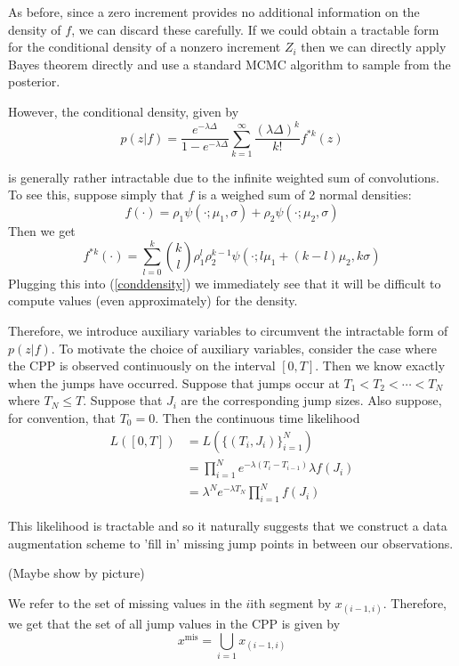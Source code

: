 \documentclass[a4paper,11pt]{article}
\theoremstyle{theorem}
\theoremstyle{definition}
\theoremstyle{remark}
\begin{document}
As before, since a zero increment provides no additional information on the density of $f$, we can discard these carefully. If we could obtain a tractable form for the conditional density of a nonzero increment $Z_i$ then we can directly apply Bayes theorem directly and use a standard MCMC algorithm to sample from the posterior.

However, the conditional density, given by
\begin{equation} \label{conddensity}
p(z | f) = \frac{e^{-\lambda \Delta}}{1- e^{-\lambda \Delta}}\sum_{k=1}^{\infty}{\frac{(\lambda \Delta)^k}{k!}f^{\ast k}(z)}
\end{equation}


is generally rather intractable due to the infinite weighted sum of convolutions. To see this, suppose simply that $f$ is a weighed sum of 2 normal densities:
\[
f(\cdot) = \rho_1 \psi(\cdot; \mu_1, \sigma) + \rho_2 \psi(\cdot; \mu_2, \sigma)
\]
Then we get
\[
f^{\ast k}(\cdot) = \sum_{l=0}^{k}{\binom{k}{l} \rho_{1}^{l}\rho_{2}^{k-1}\psi(\cdot; l\mu_1 + (k-l)\mu_2, k\sigma)}
\]
Plugging this into (\ref{conddensity}) we immediately see that it will be difficult to compute values (even approximately) for the density.

Therefore, we introduce auxiliary variables to circumvent the intractable form of $p(z | f)$. To motivate the choice of auxiliary variables, consider the case where the CPP is observed continuously on the interval $[0, T]$.
Then we know exactly when the jumps have occurred. Suppose that jumps occur at $T_1 < T_2 < \dotsb < T_N$ where $T_N \leq T$. Suppose that $J_i$ are the corresponding jump sizes. Also suppose, for convention, that $T_0 = 0$. Then the continuous time likelihood
\begin{align*}
L([0, T]) &= L(\{(T_i, J_i)\}_{i=1}^{N}) \\
&= \prod_{i=1}^{N}{e^{-\lambda (T_i  - T_{i-1})}\lambda f(J_i)} \\
&= \lambda^N e^{-\lambda T_N} \prod_{i=1}^{N}{f(J_i)}
\end{align*}

This likelihood is tractable and so it naturally suggests that we construct a data augmentation scheme to 'fill in' missing jump points in between our observations.

(Maybe show by picture)

We refer to the set of missing values in the $i$ith segment by $x_{(i-1, i)}$. Therefore, we get that the set of all jump values in the CPP is given by
\[
x^{\text{mis}} = \bigcup_{i=1} x_{(i-1, i)}
\]
\end{document}
